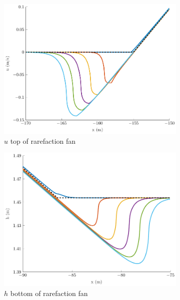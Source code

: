 \documentclass[10pt]{elsarticle}
\begin{document}
\begin{figure}
\begin{subfigure}{0.32\textwidth}
		\centering
		\includegraphics[width=\textwidth]{./Figures/Simulations/Study/RegSWWE/Convergence/uRFtop.pdf}
		\caption{$u$ top of rarefaction fan}
	\end{subfigure}
	\begin{subfigure}{0.32\textwidth}
	\centering
	\includegraphics[width=\textwidth]{./Figures/Simulations/Study/RegSWWE/Convergence/hRFBot.pdf}
	\caption{$h$ bottom of rarefaction fan}
	\end{subfigure}
	\begin{subfigure}{0.32\textwidth}
	\centering

\end{subfigure}
\end{figure}
\end{document}
